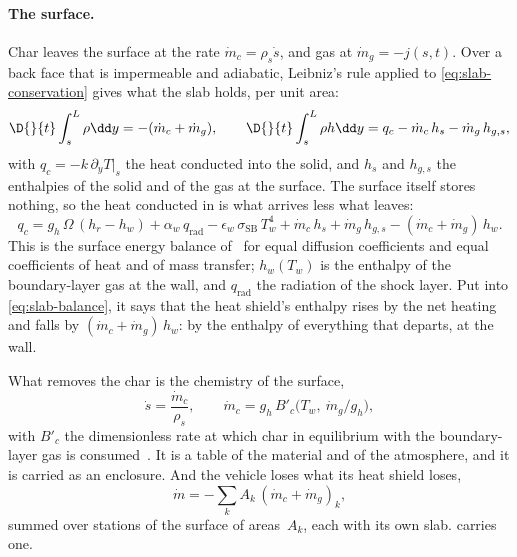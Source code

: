 \paragraph{The surface.}
Char leaves the surface at the rate $\dot m_c = \rho_s\dot s$, and gas at
$\dot m_g = -j(s,t)$. Over a back face that is impermeable and adiabatic,
Leibniz's rule applied to \cref{eq:slab-conservation} gives what the slab
holds, per unit area:
\begin{equation}\label{eq:slab-balance}
  \D{}{t}\int_s^L\rho\dd y = -(\dot m_c + \dot m_g),
  \qquad
  \D{}{t}\int_s^L\rho h\dd y = q_c - \dot m_c\,h_s - \dot m_g\,h_{g,s},
\end{equation}
with $q_c = -k\,\partial_y T|_{s}$ the heat conducted into the solid, and
$h_s$ and $h_{g,s}$ the enthalpies of the solid and of the gas at the
surface. The surface itself stores nothing, so the heat conducted in is
what arrives less what leaves:
\begin{equation}\label{eq:surface-balance}
  q_c = g_h\,\Omega\,(h_r - h_w) + \alpha_w\,q_{\mathrm{rad}}
        - \epsilon_w\,\sigma_{\mathrm{SB}}\,T_w^4
        + \dot m_c\,h_s + \dot m_g\,h_{g,s}
        - (\dot m_c + \dot m_g)\,h_w .
\end{equation}
This is the surface energy balance of~\cite[Eq.~(10)]{chen1999ablation} for
equal diffusion coefficients and equal coefficients of heat and of mass
transfer; $h_w(T_w)$ is the enthalpy of the boundary-layer gas at the wall,
and $q_{\mathrm{rad}}$ the radiation of the shock layer. Put into
\cref{eq:slab-balance}, it says that the heat shield's enthalpy rises by the
net heating and falls by $(\dot m_c + \dot m_g)\,h_w$: by the enthalpy of
everything that departs, at the wall.

What removes the char is the chemistry of the surface,
\begin{equation}\label{eq:recession}
  \dot s = \frac{\dot m_c}{\rho_s},
  \qquad
  \dot m_c = g_h\,B'_c\bigl(T_w,\ \dot m_g/g_h\bigr),
\end{equation}
with $B'_c$ the dimensionless rate at which char in equilibrium with the
boundary-layer gas is consumed~\cite{kendall1967multicomponent}. It is a
table of the material and of the atmosphere, and it is carried as an
enclosure. And the vehicle loses what its heat shield loses,
\begin{equation}\label{eq:mass-rate}
  \dot m = -\sum_k A_k\,(\dot m_c + \dot m_g)_k ,
\end{equation}
summed over stations of the surface of areas~$A_k$, each with its own slab.
 carries one.

